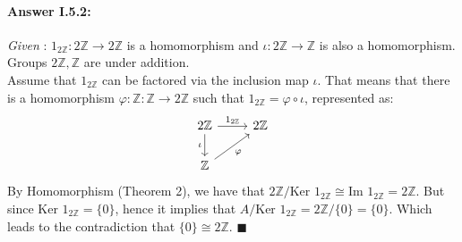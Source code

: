 \documentclass{article}
\theoremstyle{definition}
\theoremstyle{remark}
\theoremstyle{definition}
\theoremstyle{definition}
\newenvironment{customproof}[1]{\paragraph{Answer #1:}}{\hfill\ensuremath{\blacksquare}}
\newcommand{\image}[0]{\text{Im }}
\newcommand{\kernel}[0]{\text{Ker }}
\newcommand{\isomorph}{\cong}
\newcommand{\groupINT}[0]{\mathbb{Z}}
\begin{document}
\hrulefill
\begin{customproof}{I.5.2}
	\emph{Given} : $ 1_{2\mathbb{Z}} : 2\mathbb{Z} \to 2\mathbb{Z} $ is a homomorphism and $ \iota : 2\mathbb{Z} \to \mathbb{Z} $ is also a homomorphism. Groups $ 2\groupINT, \groupINT $ are under addition.\\
	Assume that $ 1_{2\mathbb{Z}} $ can be factored via the inclusion map $ \iota $. That means that there is a homomorphism $ \varphi :  \groupINT : \mathbb{Z} \to 2\mathbb{Z}$ such that $ 1_{2\mathbb{Z}} = \varphi \circ \iota $, represented as:
	\[\begin{tikzcd}
		2\groupINT\arrow[swap]{d}{\iota} \arrow{r}{1_{2\groupINT}} &2\groupINT\\
		\groupINT \arrow[swap]{ur}{\varphi}
	\end{tikzcd}\]
By Homomorphism (Theorem 2), we have that $ 2\groupINT/\kernel1_{2\groupINT} \isomorph \image 1_{2\groupINT} = 2\groupINT $. But since $ \kernel 1_{2\groupINT} = \{0\} $, hence it implies that $ A/\kernel 1_{2\groupINT} = 2\groupINT/\{0\} = \{0\} $. Which leads to the contradiction that $ \{0\} \isomorph 2\groupINT $.
\end{customproof}
\end{document}
